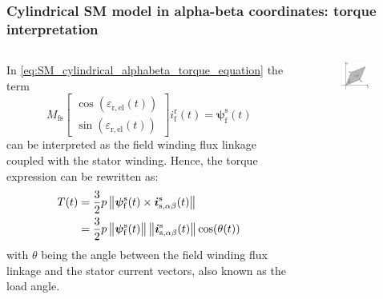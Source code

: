 \begin{frame}
	\frametitle{Cylindrical SM model in alpha-beta coordinates: torque interpretation}
    \begin{columns}
		\begin{column}{0.55\textwidth}
			In \eqref{eq:SM_cylindrical_alphabeta_torque_equation} the term
			\begin{equation}
				M_\mathrm{fs} \begin{bmatrix}\cos(\varepsilon_\mathrm{r,el}(t))\\ \sin(\varepsilon_\mathrm{r,el}(t))\end{bmatrix} i^\mathrm{r}_{\mathrm{f}}(t) =\bm{\psi}^\mathrm{s}_{\mathrm{f}}(t)
			\end{equation}
			can be interpreted as the field winding flux linkage coupled with the stator winding. Hence, the torque expression can be rewritten as:
			\begin{equation}
				\begin{split}
				T(t) &= \frac{3}{2} p \left\|\bm{\psi}^\mathrm{s}_{\mathrm{f}}(t) \times \bm{i}^\mathrm{s}_{\mathrm{s,\alpha\beta}}(t)\right\| \\ &= \frac{3}{2} p \left\|\bm{\psi}^\mathrm{s}_{\mathrm{f}}(t) \vphantom{\bm{i}^\mathrm{s}_{\mathrm{s,\alpha\beta}}(t)}\right\| \left\| \bm{i}^\mathrm{s}_{\mathrm{s,\alpha\beta}}(t)\right\| \cos(\theta(t))
			\end{split}
			\end{equation}
			with $\theta$ being the angle between the field winding flux linkage and the stator current vectors, also known as the load angle.
        \end{column}
        \begin{column}{0.45\textwidth}
            \begin{figure}
                \centering
                \includegraphics[width=0.75\textwidth]{fig/lec07/Torque_interpretation.pdf}

\end{figure}
\end{column}
\end{columns}
\end{frame}
